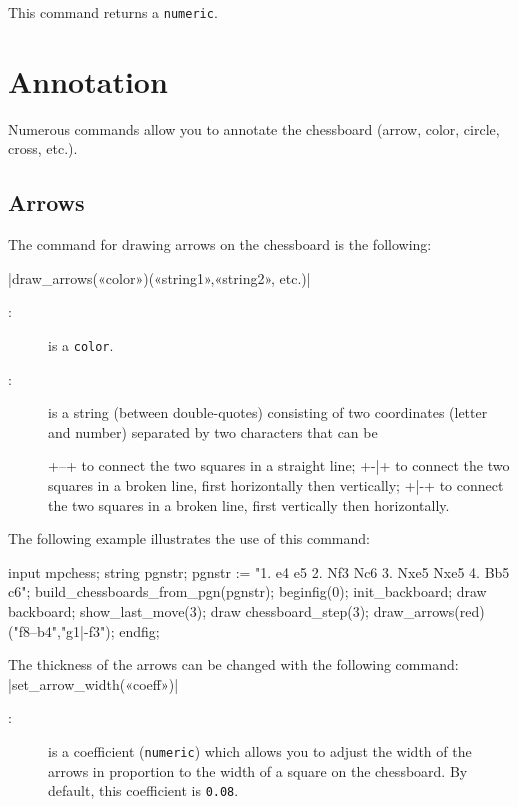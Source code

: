 \documentclass[english]{ltxdoc}
\begin{document}
This command returns a \lstinline+numeric+.

\section{Annotation}

Numerous commands allow you to annotate the chessboard (arrow, color, circle, cross,
etc.).

\subsection{Arrows}

The command for drawing arrows on the chessboard is the following:

\commande|draw_arrows(«color»)(«string1»,«string2», etc.)|\smallskip
\begin{description}
\item[:] is a \MP{} \lstinline+color+.
\item[:] is a string (between double-quotes) consisting of two
coordinates (letter and number) separated by two characters that can be 
\begin{description}
\vitem+--+ to connect the two squares in a straight line;
\vitem+-|+ to connect the two squares in a broken line, first horizontally then
vertically; 
\vitem+|-+ to connect the two squares in a broken line, first vertically then
horizontally. 
\end{description}
\end{description}

The following example illustrates the use of this command:

\begin{ExempleMP}
input mpchess;
string pgnstr;
pgnstr := "1. e4 e5 2. Nf3 Nc6 3. Nxe5 Nxe5 4. Bb5 c6";
build_chessboards_from_pgn(pgnstr);
beginfig(0);
init_backboard;
draw backboard;
show_last_move(3);
draw chessboard_step(3); %
draw_arrows(red)("f8--b4","g1|-f3");
endfig;
\end{ExempleMP}

The thickness of the arrows can be changed with the following command:
\commande|set_arrow_width(«coeff»)|\smallskip

\begin{description}
  \item[:] is a coefficient (\lstinline+numeric+) which allows you 
  to adjust the width of the arrows in proportion to the width of a square on the chessboard. By default, this coefficient is \lstinline+0.08+.
\end{description}
\end{document}
